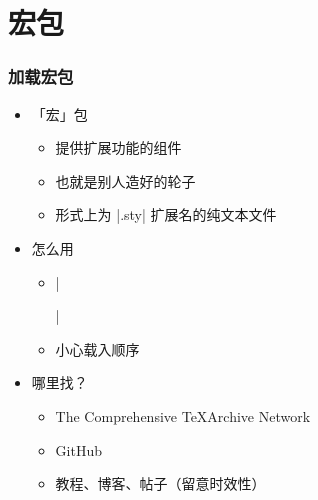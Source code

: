 \section{宏包}

\begin{frame}[fragile]
\frametitle{加载宏包}
\begin{itemize}
  \item<+-> 「宏」包

    \begin{itemize}
      \item 提供扩展功能的组件
      \item 也就是别人造好的轮子
      \item 形式上为 |.sty| 扩展名的纯文本文件
    \end{itemize}

  \item<+-> 怎么用

    \begin{itemize}
      \item |\usepackage{ctex}|
      \item 小心载入顺序
    \end{itemize}

  \item<+-> 哪里找？

    \begin{itemize}
      \item The Comprehensive \TeX Archive Network 
      \item GitHub
      \item<+-> 教程、博客、帖子（\alert{留意时效性}）
    \end{itemize}
\end{itemize}
\end{frame}

